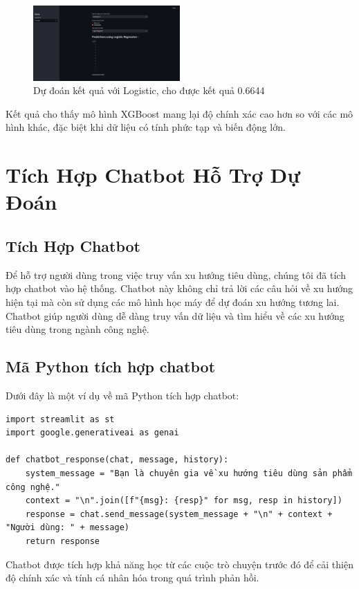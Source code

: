 \documentclass[a4paper,12pt]{report}
\begin{document}
\begin{figure}[h]
    \centering
    \includegraphics[width=0.5\textwidth]{image/predict_logi.png}
    \caption{Dự đoán kết quả với Logistic, cho được kết quả 0.6644 }
    \label{fig:predict}
\end{figure}

Kết quả cho thấy mô hình XGBoost mang lại độ chính xác cao hơn so với các mô hình khác, đặc biệt khi dữ liệu có tính phức tạp và biến động lớn.

\section{Tích Hợp Chatbot Hỗ Trợ Dự Đoán}

\subsection{Tích Hợp Chatbot}
Để hỗ trợ người dùng trong việc truy vấn xu hướng tiêu dùng, chúng tôi đã tích hợp chatbot vào hệ thống. Chatbot này không chỉ trả lời các câu hỏi về xu hướng hiện tại mà còn sử dụng các mô hình học máy để dự đoán xu hướng tương lai. Chatbot giúp người dùng dễ dàng truy vấn dữ liệu và tìm hiểu về các xu hướng tiêu dùng trong ngành công nghệ.

\subsection{Mã Python tích hợp chatbot}
Dưới đây là một ví dụ về mã Python tích hợp chatbot:

\begin{verbatim}
import streamlit as st
import google.generativeai as genai

def chatbot_response(chat, message, history):
    system_message = "Bạn là chuyên gia về xu hướng tiêu dùng sản phẩm công nghệ."
    context = "\n".join([f"{msg}: {resp}" for msg, resp in history])
    response = chat.send_message(system_message + "\n" + context + "Người dùng: " + message)
    return response
\end{verbatim}

Chatbot được tích hợp khả năng học từ các cuộc trò chuyện trước đó để cải thiện độ chính xác và tính cá nhân hóa trong quá trình phản hồi.
\end{document}
